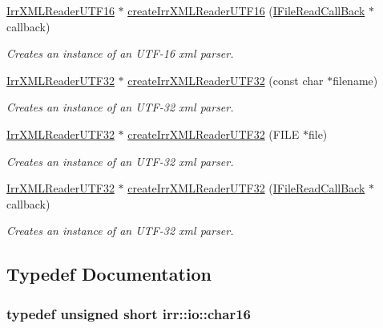 \begin{CompactItemize}
\hyperlink{classirr_1_1io_1_1_i_irr_x_m_l_reader}{IrrXMLReaderUTF16} $\ast$ \hyperlink{namespaceirr_1_1io_22f1e46e541bcdbe778ce89c37ee9743}{createIrrXMLReaderUTF16} (\hyperlink{classirr_1_1io_1_1_i_file_read_call_back}{IFileReadCallBack} $\ast$callback)
\begin{CompactList}\small\item\em Creates an instance of an UTF-16 xml parser. \item\end{CompactList}\item 
\hyperlink{classirr_1_1io_1_1_i_irr_x_m_l_reader}{IrrXMLReaderUTF32} $\ast$ \hyperlink{namespaceirr_1_1io_42c53128ecf88af927030b6b9ea5afc2}{createIrrXMLReaderUTF32} (const char $\ast$filename)
\begin{CompactList}\small\item\em Creates an instance of an UTF-32 xml parser. \item\end{CompactList}\item 
\hyperlink{classirr_1_1io_1_1_i_irr_x_m_l_reader}{IrrXMLReaderUTF32} $\ast$ \hyperlink{namespaceirr_1_1io_6a0c291795bc8b08dc57bb5c6af9893f}{createIrrXMLReaderUTF32} (FILE $\ast$file)
\begin{CompactList}\small\item\em Creates an instance of an UTF-32 xml parser. \item\end{CompactList}\item 
\hyperlink{classirr_1_1io_1_1_i_irr_x_m_l_reader}{IrrXMLReaderUTF32} $\ast$ \hyperlink{namespaceirr_1_1io_751d8f7391b4b0bc09747ad46b119e28}{createIrrXMLReaderUTF32} (\hyperlink{classirr_1_1io_1_1_i_file_read_call_back}{IFileReadCallBack} $\ast$callback)
\begin{CompactList}\small\item\em Creates an instance of an UTF-32 xml parser. \item\end{CompactList}\end{CompactItemize}


\subsection{Typedef Documentation}
\hypertarget{namespaceirr_1_1io_5e70682de915fd223e6aa77bb693fc74}{
\subsubsection[{char16}]{\setlength{\rightskip}{0pt plus 5cm}typedef unsigned short {\bf irr::io::char16}}}
\label{namespaceirr_1_1io_5e70682de915fd223e6aa77bb693fc74}


